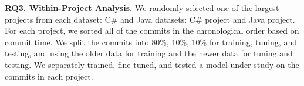 
\noindent\textbf{RQ3. Within-Project Analysis.} We randomly selected one of the largest projects from each dataset: C\# and Java datasets:   C\# project and  Java project. For each project, we sorted all of the commits in the chronological order based on commit time. We split the commits into 80\%, 10\%, 10\% for training, tuning, and testing, and using the older data for training
and the newer data for tuning and testing. We separately trained, fine-tuned, and tested a model under study on
the commits in each project. 







